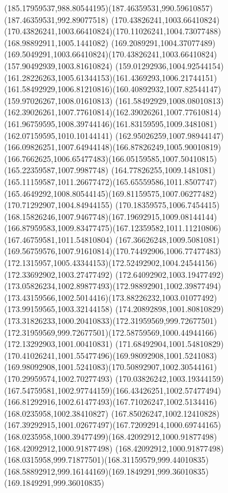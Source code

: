 {    \curveto(185.17959537,988.80544195)(187.46359531,990.59610857)(187.46359531,992.89077518)
    \moveto(170.43826241,1003.66410824)
    \curveto(170.43826241,1003.66410824)(170.11026241,1004.73077488)(168.98892911,1005.1441082)
    \curveto(169.2089291,1004.37077489)(169.5049291,1003.66410824)(170.43826241,1003.66410824)
    \moveto(157.90492939,1003.81610824)
    \curveto(159.01292936,1004.92544154)(161.28226263,1005.61344153)(161.4369293,1006.21744151)
    \curveto(161.58492929,1006.81210816)(160.40892932,1007.82544147)(159.97026267,1008.01610813)
    \curveto(161.58492929,1008.08010813)(162.39026261,1007.77610814)(162.39026261,1007.77610814)
    \curveto(161.96759595,1008.39744146)(161.83159595,1009.3481081)(162.07159595,1010.10144141)
    \curveto(162.95026259,1007.98944147)(166.09826251,1007.64944148)(166.87826249,1005.90010819)
    \curveto(166.7662625,1006.65477483)(166.05159585,1007.50410815)(165.22359587,1007.9987748)
    \curveto(164.77826255,1009.1481081)(165.11159587,1011.26677472)(165.65559586,1011.8507747)
    \curveto(165.4649292,1008.80544145)(169.81159575,1007.06277482)(170.71292907,1004.84944155)
    \curveto(170.18359575,1006.7454415)(168.15826246,1007.9467748)(167.19692915,1009.08144144)
    \curveto(166.87959583,1009.83477475)(167.12359582,1011.11210806)(167.46759581,1011.54810804)
    \curveto(167.36626248,1009.5081081)(169.56759576,1007.91610814)(170.74492906,1006.77477483)
    \curveto(172.1315957,1005.43344153)(172.52492902,1004.24544156)(172.33692902,1003.27477492)
    \curveto(172.64092902,1003.19477492)(173.05826234,1002.89877493)(172.98892901,1002.39877494)
    \curveto(173.43159566,1002.5014416)(173.88226232,1003.01077492)(173.99159565,1003.32144158)
    \curveto(174.20892898,1001.80810829)(173.31826233,1000.20410833)(172.31959569,999.72677501)
    \curveto(172.31959569,999.72677501)(172.58759569,1000.44944166)(172.13292903,1001.00410831)
    \curveto(171.68492904,1001.54810829)(170.41026241,1001.55477496)(169.98092908,1001.5241083)
    \curveto(169.98092908,1001.5241083)(170.50892907,1002.30544161)(170.29959574,1002.70277493)
    \curveto(170.03826242,1003.19344159)(167.54759581,1002.97744159)(166.43426251,1002.57477494)
    \curveto(166.81292916,1002.61477493)(167.71026247,1002.5134416)(168.0235958,1002.38410827)
    \curveto(167.85026247,1002.12410828)(167.39292915,1001.02677497)(167.72092914,1000.69744165)
    \curveto(168.0235958,1000.39477499)(168.42092912,1000.91877498)(168.42092912,1000.91877498)
    \curveto(168.42092912,1000.91877498)(168.0315958,999.71877501)(168.31159579,999.44010835)
    \curveto(168.58892912,999.16144169)(169.1849291,999.36010835)(169.1849291,999.36010835)
}
